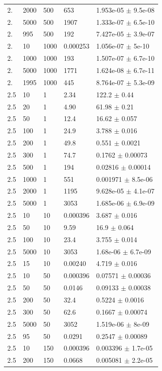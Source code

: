 \begin{longtable}{lllll}
	2. & 2000 & 500 & 653 & 1.953e-05 $\pm$ 9.5e-08 \\
	2. & 5000 & 500 & 1907 & 1.333e-07 $\pm$ 6.5e-10 \\
	2. & 995 & 500 & 192 & 7.427e-05 $\pm$ 3.9e-07 \\
	2. & 10 & 1000 & 0.000253 & 1.056e-07 $\pm$ 5e-10 \\
	2. & 1000 & 1000 & 193 & 1.507e-07 $\pm$ 6.7e-10 \\
	2. & 5000 & 1000 & 1771 & 1.624e-08 $\pm$ 6.7e-11 \\
	2. & 1995 & 1000 & 445 & 8.764e-07 $\pm$ 5.3e-09 \\
	2.5 & 10 & 1 & 2.34 & 122.2 $\pm$ 0.44 \\
	2.5 & 20 & 1 & 4.90 & 61.98 $\pm$ 0.21 \\
	2.5 & 50 & 1 & 12.4 & 16.62 $\pm$ 0.057 \\
	2.5 & 100 & 1 & 24.9 & 3.788 $\pm$ 0.016 \\
	2.5 & 200 & 1 & 49.8 & 0.551 $\pm$ 0.0021 \\
	2.5 & 300 & 1 & 74.7 & 0.1762 $\pm$ 0.00073 \\
	2.5 & 500 & 1 & 194 & 0.02816 $\pm$ 0.00014 \\
	2.5 & 1000 & 1 & 551 & 0.001971 $\pm$ 8.5e-06 \\
	2.5 & 2000 & 1 & 1195 & 9.628e-05 $\pm$ 4.1e-07 \\
	2.5 & 5000 & 1 & 3053 & 1.685e-06 $\pm$ 6.9e-09 \\
	2.5 & 10 & 10 & 0.000396 & 3.687 $\pm$ 0.016 \\
	2.5 & 50 & 10 & 9.59 & 16.9 $\pm$ 0.064 \\
	2.5 & 100 & 10 & 23.4 & 3.755 $\pm$ 0.014 \\
	2.5 & 5000 & 10 & 3053 & 1.68e-06 $\pm$ 6.7e-09 \\
	2.5 & 15 & 10 & 0.00240 & 4.719 $\pm$ 0.016 \\
	2.5 & 10 & 50 & 0.000396 & 0.07571 $\pm$ 0.00036 \\
	2.5 & 50 & 50 & 0.0146 & 0.09133 $\pm$ 0.00038 \\
	2.5 & 200 & 50 & 32.4 & 0.5224 $\pm$ 0.0016 \\
	2.5 & 300 & 50 & 62.6 & 0.1667 $\pm$ 0.00074 \\
	2.5 & 5000 & 50 & 3052 & 1.519e-06 $\pm$ 8e-09 \\
	2.5 & 95 & 50 & 0.0291 & 0.2547 $\pm$ 0.00089 \\
	2.5 & 10 & 150 & 0.000396 & 0.003396 $\pm$ 1.7e-05 \\
	2.5 & 200 & 150 & 0.0668 & 0.005081 $\pm$ 2.2e-05 \\

\end{longtable}
